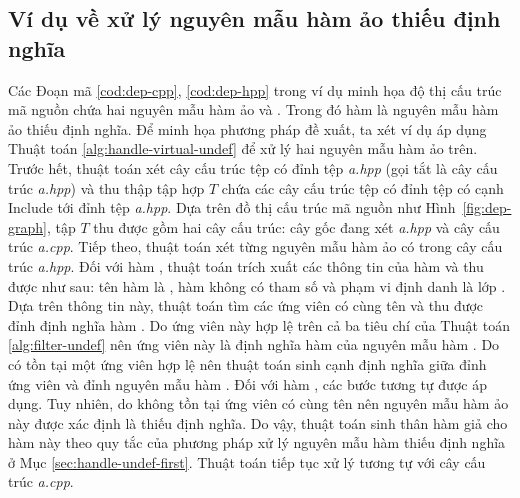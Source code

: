 \subsection*{Ví dụ về xử lý nguyên mẫu hàm ảo thiếu định nghĩa}
Các Đoạn mã \autoref{cod:dep-cpp}, \autoref{cod:dep-hpp} trong ví dụ minh họa độ thị cấu trúc mã nguồn chứa hai nguyên mẫu hàm ảo  và . Trong đó hàm  là nguyên mẫu hàm ảo thiếu định nghĩa. Để minh họa phương pháp đề xuất, ta xét ví dụ áp dụng Thuật toán \autoref{alg:handle-virtual-undef} để xử lý hai nguyên mẫu hàm ảo trên. Trước hết, thuật toán xét cây cấu trúc tệp có đỉnh tệp \textit{a.hpp} (gọi tắt là cây cấu trúc \textit{a.hpp}) và thu thập tập hợp $T$ chứa các cây cấu trúc tệp có đỉnh tệp có cạnh Include tới đỉnh tệp \textit{a.hpp}. Dựa trên đồ thị cấu trúc mã nguồn như Hình~\autoref{fig:dep-graph}, tập $T$ thu được gồm hai cây cấu trúc: cây gốc đang xét \textit{a.hpp} và cây cấu trúc \textit{a.cpp}. Tiếp theo, thuật toán xét từng nguyên mẫu hàm ảo có trong cây cấu trúc \textit{a.hpp}. Đối với hàm , thuật toán trích xuất các thông tin của hàm và thu được như sau: tên hàm là , hàm không có tham số và phạm vi định danh là lớp . Dựa trên thông tin này, thuật toán tìm các ứng viên có cùng tên  và thu được đỉnh định nghĩa hàm . Do ứng viên này hợp lệ trên cả ba tiêu chí của Thuật toán \autoref{alg:filter-undef} nên ứng viên này là định nghĩa hàm của nguyên mẫu hàm . Do có tồn tại một ứng viên hợp lệ nên thuật toán sinh cạnh định nghĩa giữa đỉnh ứng viên và đỉnh nguyên mẫu hàm . Đối với hàm , các bước tương tự được áp dụng. Tuy nhiên, do không tồn tại ứng viên có cùng tên  nên nguyên mẫu hàm ảo này được xác định là thiếu định nghĩa. Do vậy, thuật toán sinh thân hàm giả cho hàm này theo quy tắc của phương pháp xử lý nguyên mẫu hàm thiếu định nghĩa ở Mục \autoref{sec:handle-undef-first}. Thuật toán tiếp tục xử lý tương tự với cây cấu trúc \textit{a.cpp}. 

%    

